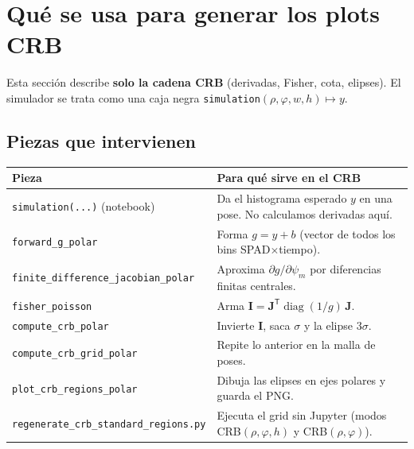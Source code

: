 \documentclass[11pt,a4paper]{article}
\theoremstyle{definition}
\newcommand{\matr}[1]{\mathbf{#1}}
\DeclareMathOperator{\diag}{diag}
\begin{document}
\section{Qu\'e se usa para generar los plots CRB}
\label{sec:flujo}

Esta secci\'on describe \textbf{solo la cadena CRB} (derivadas, Fisher, cota,
elipses). El simulador se trata como una caja negra
\texttt{simulation}$(\rho,\varphi,w,h)\mapsto y$.

\subsection{Piezas que intervienen}
\begin{center}
\small
\begin{tabular}{@{}p{4.6cm}p{9.1cm}@{}}
\toprule
Pieza & Para qu\'e sirve en el CRB \\
\midrule
\texttt{simulation(...)} (notebook) &
Da el histograma esperado $y$ en una pose. No calculamos derivadas aqu\'i. \\
\texttt{forward\_g\_polar} &
Forma $g=y+b$ (vector de todos los bins SPAD$\times$tiempo). \\
\texttt{finite\_difference\_jacobian\_polar} &
Aproxima $\partial g/\partial\psi_m$ por diferencias finitas centrales. \\
\texttt{fisher\_poisson} &
Arma $\matr{I}=\matr{J}^{\mathsf T}\diag(1/g)\,\matr{J}$. \\
\texttt{compute\_crb\_polar} &
Invierte $\matr{I}$, saca $\sigma$ y la elipse $3\sigma$. \\
\texttt{compute\_crb\_grid\_polar} &
Repite lo anterior en la malla de poses. \\
\texttt{plot\_crb\_regions\_polar} &
Dibuja las elipses en ejes polares y guarda el PNG. \\
\texttt{regenerate\_crb\_standard\_regions.py} &
Ejecuta el grid sin Jupyter (modos CRB$(\rho,\varphi,h)$ y CRB$(\rho,\varphi)$). \\
\bottomrule
\end{tabular}
\end{center}
\end{document}
